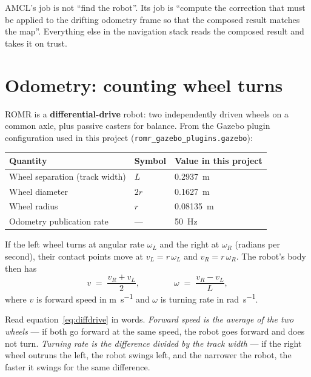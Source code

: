 \documentclass[11pt,a4paper]{report}
\newcommand{\term}[1]{\textcolor{rust}{\textbf{#1}}}
\newcommand{\file}[1]{\texttt{\small #1}}
\begin{document}
\begin{keyidea}
AMCL's job is not ``find the robot''. Its job is ``compute the correction that
must be applied to the drifting odometry frame so that the composed result
matches the map''. Everything else in the navigation stack reads the composed
result and takes it on trust.
\end{keyidea}

\section{Odometry: counting wheel turns}

ROMR is a \term{differential-drive} robot: two independently driven wheels on
a common axle, plus passive casters for balance. From the Gazebo plugin
configuration used in this project (\file{romr\_gazebo\_plugins.gazebo}):

\begin{center}
\begin{tabular}{@{}lll@{}}
\toprule
\textbf{Quantity} & \textbf{Symbol} & \textbf{Value in this project} \\
\midrule
Wheel separation (track width) & $L$ & \SI{0.2937}{\metre} \\
Wheel diameter                 & $2r$& \SI{0.1627}{\metre} \\
Wheel radius                   & $r$ & \SI{0.08135}{\metre} \\
Odometry publication rate      & --- & \SI{50}{\hertz} \\
\bottomrule
\end{tabular}
\end{center}

If the left wheel turns at angular rate $\omega_L$ and the right at
$\omega_R$ (radians per second), their contact points move at
$v_L = r\,\omega_L$ and $v_R = r\,\omega_R$. The robot's body then has
\begin{equation}
v \;=\; \frac{v_R + v_L}{2}, \qquad\qquad
\omega \;=\; \frac{v_R - v_L}{L},
\label{eq:diffdrive}
\end{equation}
where $v$ is forward speed in \si{\metre\per\second} and $\omega$ is turning
rate in \si{\radian\per\second}.

Read equation~\eqref{eq:diffdrive} in words. \emph{Forward speed is the
average of the two wheels} --- if both go forward at the same speed, the robot
goes forward and does not turn. \emph{Turning rate is the difference divided
by the track width} --- if the right wheel outruns the left, the robot swings
left, and the narrower the robot, the faster it swings for the same
difference.
\end{document}
